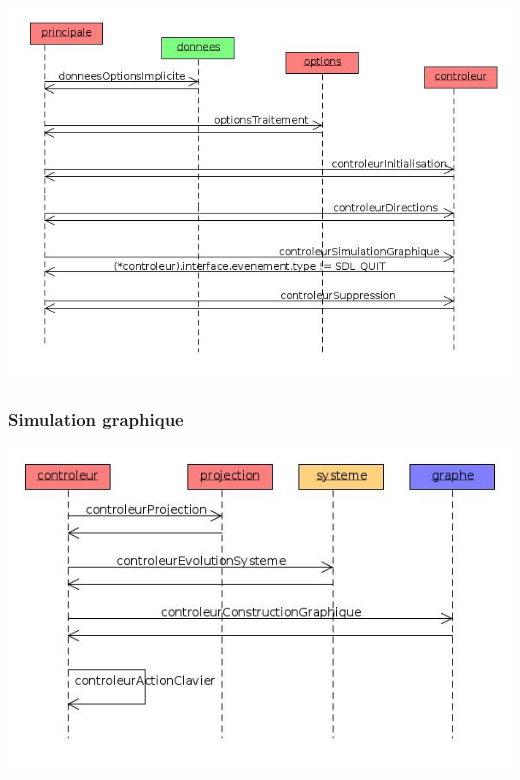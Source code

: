 \vspace{.91cm}
\includegraphics[width=.95\textwidth]{./illustration/sequencePrincipale2}
%
\subsubsection{Simulation graphique}
\includegraphics[width=.95\textwidth]{./illustration/sequenceControleur}
%
\newpage
%
